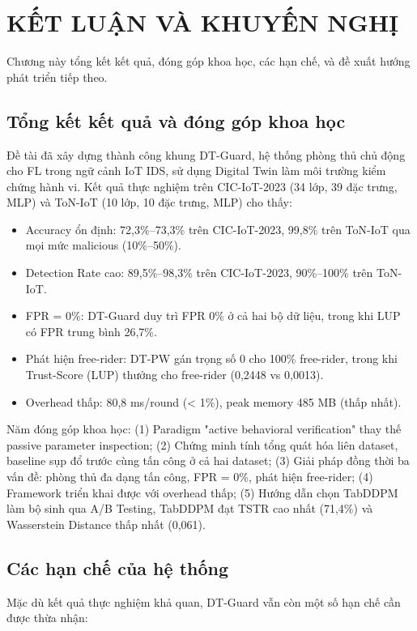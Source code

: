 \chapter{KẾT LUẬN VÀ KHUYẾN NGHỊ}
\label{Chapter6}

Chương này tổng kết kết quả, đóng góp khoa học, các hạn chế, và đề xuất hướng phát triển tiếp theo.

\section{Tổng kết kết quả và đóng góp khoa học}
Đề tài đã xây dựng thành công khung DT-Guard, hệ thống phòng thủ chủ động cho FL trong ngữ cảnh IoT IDS, sử dụng Digital Twin làm môi trường kiểm chứng hành vi. Kết quả thực nghiệm trên CIC-IoT-2023 (34 lớp, 39 đặc trưng, MLP) và ToN-IoT (10 lớp, 10 đặc trưng, MLP) cho thấy:

\begin{itemize}
\item
  Accuracy ổn định: 72,3\%--73,3\% trên CIC-IoT-2023, 99,8\% trên ToN-IoT qua mọi mức malicious (10\%--50\%).
\item
  Detection Rate cao: 89,5\%--98,3\% trên CIC-IoT-2023, 90\%--100\% trên ToN-IoT.
\item
  FPR = 0\%: DT-Guard duy trì FPR 0\% ở cả hai bộ dữ liệu, trong khi LUP có FPR trung bình 26,7\%.
\item
  Phát hiện free-rider: DT-PW gán trọng số 0 cho 100\% free-rider, trong khi Trust-Score (LUP) thưởng cho free-rider (0,2448 vs 0,0013).
\item
  Overhead thấp: 80,8 ms/round (\textless{} 1\%), peak memory 485 MB (thấp nhất).
\end{itemize}

Năm đóng góp khoa học: (1) Paradigm "active behavioral verification" thay thế passive parameter inspection; (2) Chứng minh tính tổng quát hóa liên dataset, baseline sụp đổ trước cùng tấn công ở cả hai dataset; (3) Giải pháp đồng thời ba vấn đề: phòng thủ đa dạng tấn công, FPR = 0\%, phát hiện free-rider; (4) Framework triển khai được với overhead thấp; (5) Hướng dẫn chọn TabDDPM làm bộ sinh qua A/B Testing, TabDDPM đạt TSTR cao nhất (71,4\%) và Wasserstein Distance thấp nhất (0,061).

\section{Các hạn chế của hệ thống}
Mặc dù kết quả thực nghiệm khả quan, DT-Guard vẫn còn một số hạn chế cần được thừa nhận:

